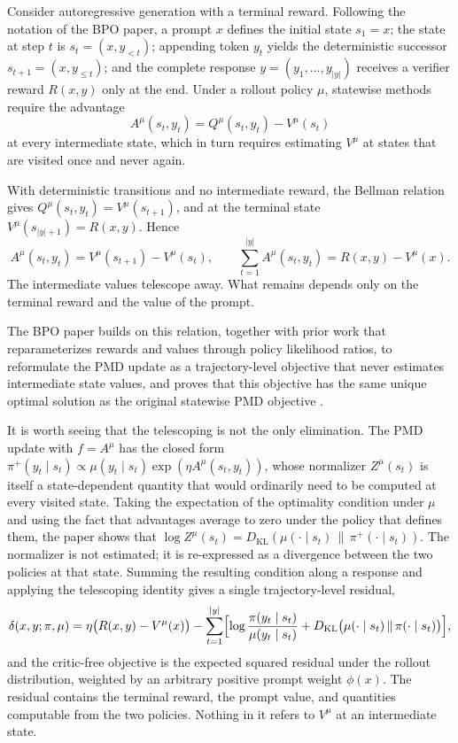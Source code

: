 \documentclass[11pt]{article}
\theoremstyle{remark}
\begin{document}
Consider autoregressive generation with a terminal reward. Following the notation of the BPO paper, a prompt $x$ defines the initial state $s_1=x$; the state at step $t$ is $s_t=(x,y_{<t})$; appending token $y_t$ yields the deterministic successor $s_{t+1}=(x,y_{\le t})$; and the complete response $y=(y_1,\dots,y_{|y|})$ receives a verifier reward $R(x,y)$ only at the end. Under a rollout policy $\mu$, statewise methods require the advantage
\[
A^\mu(s_t,y_t) = Q^\mu(s_t,y_t) - V^\mu(s_t)
\]
at every intermediate state, which in turn requires estimating $V^\mu$ at states that are visited once and never again.

With deterministic transitions and no intermediate reward, the Bellman relation gives $Q^\mu(s_t,y_t)=V^\mu(s_{t+1})$, and at the terminal state $V^\mu(s_{|y|+1})=R(x,y)$. Hence
\[
A^\mu(s_t,y_t) = V^\mu(s_{t+1}) - V^\mu(s_t),
\qquad
\sum_{t=1}^{|y|} A^\mu(s_t,y_t) = R(x,y) - V^\mu(x).
\]
The intermediate values telescope away. What remains depends only on the terminal reward and the value of the prompt.

The BPO paper builds on this relation, together with prior work that reparameterizes rewards and values through policy likelihood ratios, to reformulate the PMD update as a trajectory-level objective that never estimates intermediate state values, and proves that this objective has the same unique optimal solution as the original statewise PMD objective \cite{bpo}.

It is worth seeing that the telescoping is not the only elimination. The PMD update with $f=A^\mu$ has the closed form $\pi^+(y_t\mid s_t)\propto\mu(y_t\mid s_t)\exp(\eta A^\mu(s_t,y_t))$, whose normalizer $Z^\mu(s_t)$ is itself a state-dependent quantity that would ordinarily need to be computed at every visited state. Taking the expectation of the optimality condition under $\mu$ and using the fact that advantages average to zero under the policy that defines them, the paper shows that $\log Z^\mu(s_t)=D_{\mathrm{KL}}(\mu(\cdot\mid s_t)\,\|\,\pi^+(\cdot\mid s_t))$. The normalizer is not estimated; it is re-expressed as a divergence between the two policies at that state. Summing the resulting condition along a response and applying the telescoping identity gives a single trajectory-level residual,
\[
\delta(x,y;\pi,\mu)=\eta\bigl(R(x,y)-V^\mu(x)\bigr)-\sum_{t=1}^{|y|}\Bigl[\log\frac{\pi(y_t\mid s_t)}{\mu(y_t\mid s_t)}+D_{\mathrm{KL}}\bigl(\mu(\cdot\mid s_t)\,\|\,\pi(\cdot\mid s_t)\bigr)\Bigr],
\]
and the critic-free objective is the expected squared residual under the rollout distribution, weighted by an arbitrary positive prompt weight $\phi(x)$. The residual contains the terminal reward, the prompt value, and quantities computable from the two policies. Nothing in it refers to $V^\mu$ at an intermediate state.
\end{document}
